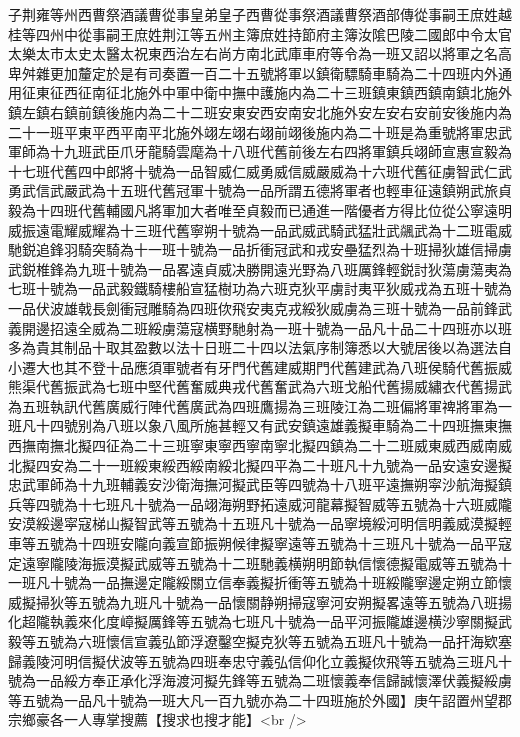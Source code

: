 子荆雍等州西曹祭酒議曹從事皇弟皇子西曹從事祭酒議曹祭酒部傳從事嗣王庶姓越桂等四州中從事嗣王庶姓荆江等五州主簿庶姓持節府主簿汝隂巴陵二國郎中令太官太樂太市太史太醫太祝東西治左右尚方南北武庫車府等令為一班又詔以將軍之名高卑舛雜更加釐定於是有司奏置一百二十五號將軍以鎮衛驃騎車騎為二十四班内外通用征東征西征南征北施外中軍中衛中撫中護施内為二十三班鎮東鎮西鎮南鎮北施外鎮左鎮右鎮前鎮後施内為二十二班安東安西安南安北施外安左安右安前安後施内為二十一班平東平西平南平北施外翊左翊右翊前翊後施内為二十班是為重號將軍忠武軍師為十九班武臣爪牙龍騎雲麾為十八班代舊前後左右四將軍鎮兵翊師宣惠宣毅為十七班代舊四中郎將十號為一品智威仁威勇威信威嚴威為十六班代舊征虜智武仁武勇武信武嚴武為十五班代舊冠軍十號為一品所謂五德將軍者也輕車征遠鎮朔武旅貞毅為十四班代舊輔國凡將軍加大者唯至貞毅而已通進一階優者方得比位從公寧遠明威振遠電耀威耀為十三班代舊寧朔十號為一品武威武騎武猛壯武飊武為十二班電威馳鋭追鋒羽騎突騎為十一班十號為一品折衝冠武和戎安壘猛烈為十班掃狄雄信掃虜武鋭椎鋒為九班十號為一品畧遠貞威决勝開遠光野為八班厲鋒輕鋭討狄蕩虜蕩夷為七班十號為一品武毅鐵騎樓船宣猛樹功為六班克狄平虜討夷平狄威戎為五班十號為一品伏波雄戟長劍衝冠雕騎為四班佽飛安夷克戎綏狄威虜為三班十號為一品前鋒武義開邊招遠全威為二班綏虜蕩寇横野馳射為一班十號為一品凡十品二十四班亦以班多為貴其制品十取其盈數以法十日班二十四以法氣序制簿悉以大號居後以為選法自小遷大也其不登十品應須軍號者有牙門代舊建威期門代舊建武為八班侯騎代舊振威熊渠代舊振武為七班中堅代舊奮威典戎代舊奮武為六班戈船代舊揚威繡衣代舊揚武為五班執訊代舊廣威行陣代舊廣武為四班鷹揚為三班陵江為二班偏將軍禆將軍為一班凡十四號别為八班以象八風所施甚輕又有武安鎮遠雄義擬車騎為二十四班撫東撫西撫南撫北擬四征為二十三班寧東寧西寧南寧北擬四鎮為二十二班威東威西威南威北擬四安為二十一班綏東綏西綏南綏北擬四平為二十班凡十九號為一品安遠安邊擬忠武軍師為十九班輔義安沙衛海撫河擬武臣等四號為十八班平遠撫朔寜沙航海擬鎮兵等四號為十七班凡十號為一品翊海朔野拓遠威河龍幕擬智威等五號為十六班威隴安漠綏邊寜寇梯山擬智武等五號為十五班凡十號為一品寧境綏河明信明義威漠擬輕車等五號為十四班安隴向義宣節振朔候律擬寧遠等五號為十三班凡十號為一品平寇定遠寧隴陵海振漠擬武威等五號為十二班馳義横朔明節執信懷德擬電威等五號為十一班凡十號為一品撫邊定隴綏關立信奉義擬折衝等五號為十班綏隴寧邊定朔立節懷威擬掃狄等五號為九班凡十號為一品懷關静朔掃寇寧河安朔擬畧遠等五號為八班揚化超隴執義來化度嶂擬厲鋒等五號為七班凡十號為一品平河振隴雄邊横沙寧關擬武毅等五號為六班懷信宣義弘節浮遼鑿空擬克狄等五號為五班凡十號為一品扞海欵塞歸義陵河明信擬伏波等五號為四班奉忠守義弘信仰化立義擬佽飛等五號為三班凡十號為一品綏方奉正承化浮海渡河擬先鋒等五號為二班懷義奉信歸誠懷澤伏義擬綏虜等五號為一品凡十號為一班大凡一百九號亦為二十四班施於外國】庚午詔置州望郡宗鄉豪各一人專掌搜薦【搜求也搜才能】<br />
